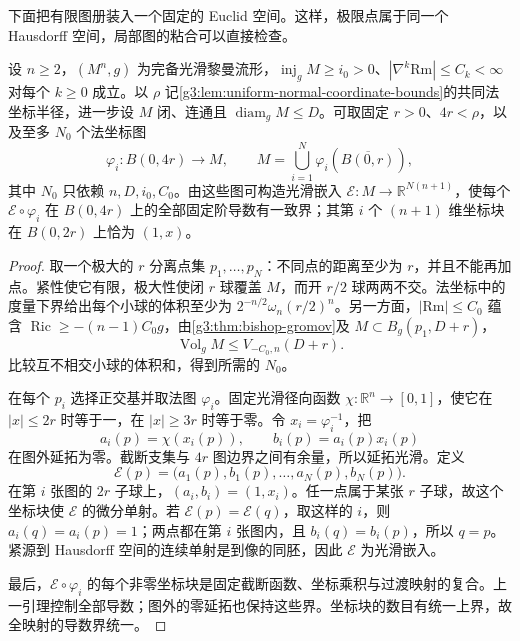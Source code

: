 下面把有限图册装入一个固定的 Euclid 空间。这样，极限点属于同一个 Hausdorff 空间，局部图的粘合可以直接检查。

\begin{lemma}\label{g3:lem:uniform-finite-atlas-embedding}
	设 \(n\ge2\)，\((M^n,g)\) 为完备光滑黎曼流形，\(\operatorname{inj}_gM\ge i_0>0\)、\(|\nabla^k\mathrm{Rm}|\le C_k<\infty\) 对每个 \(k\ge0\) 成立。以 \(\rho\) 记\cref{g3:lem:uniform-normal-coordinate-bounds}的共同法坐标半径，进一步设 \(M\) 闭、连通且 \(\operatorname{diam}_gM\le D\)。可取固定 \(r>0\)、\(4r<\rho\)，以及至多 \(N_0\) 个法坐标图
	\[
		\varphi_i:B(0,4r)\longrightarrow M,
		\qquad M=\bigcup_{i=1}^N\varphi_i(\overline{B(0,r)}),
	\]
	其中 \(N_0\) 只依赖 \(n,D,i_0,C_0\)。由这些图可构造光滑嵌入
	\(\mathcal E:M\to\mathbb R^{N(n+1)}\)，使每个
	\(\mathcal E\circ\varphi_i\) 在 \(B(0,4r)\) 上的全部固定阶导数有一致界；其第 \(i\) 个 \((n+1)\) 维坐标块在 \(B(0,2r)\) 上恰为 \((1,x)\)。
\end{lemma}
\begin{proof}
	取一个极大的 \(r\) 分离点集 \(p_1,\ldots,p_N\)：不同点的距离至少为 \(r\)，并且不能再加点。紧性使它有限，极大性使闭 \(r\) 球覆盖 \(M\)，而开 \(r/2\) 球两两不交。法坐标中的度量下界给出每个小球的体积至少为
	\(2^{-n/2}\omega_n(r/2)^n\)。另一方面，\(|\mathrm{Rm}|\le C_0\) 蕴含 \(\operatorname{Ric}\ge-(n-1)C_0g\)，由\cref{g3:thm:bishop-gromov}及 \(M\subset B_g(p_1,D+r)\)，
	\[
		\operatorname{Vol}_gM\le V_{-C_0,n}(D+r).
	\]
	比较互不相交小球的体积和，得到所需的 \(N_0\)。

	在每个 \(p_i\) 选择正交基并取法图 \(\varphi_i\)。固定光滑径向函数 \(\chi:\mathbb R^n\to[0,1]\)，使它在 \(|x|\le2r\) 时等于一，在 \(|x|\ge3r\) 时等于零。令 \(x_i=\varphi_i^{-1}\)，把
	\[
		a_i(p)=\chi(x_i(p)),\qquad b_i(p)=a_i(p)x_i(p)
	\]
	在图外延拓为零。截断支集与 \(4r\) 图边界之间有余量，所以延拓光滑。定义
	\begin{equation}\label{g3:eq:finite-atlas-embedding}
		\mathcal E(p)=\bigl(a_1(p),b_1(p),\ldots,a_N(p),b_N(p)\bigr).
	\end{equation}
	在第 \(i\) 张图的 \(2r\) 子球上，\((a_i,b_i)=(1,x_i)\)。任一点属于某张 \(r\) 子球，故这个坐标块使 \(\mathcal E\) 的微分单射。若 \(\mathcal E(p)=\mathcal E(q)\)，取这样的 \(i\)，则 \(a_i(q)=a_i(p)=1\)；两点都在第 \(i\) 张图内，且 \(b_i(q)=b_i(p)\)，所以 \(q=p\)。紧源到 Hausdorff 空间的连续单射是到像的同胚，因此 \(\mathcal E\) 为光滑嵌入。

	最后，\(\mathcal E\circ\varphi_i\) 的每个非零坐标块是固定截断函数、坐标乘积与过渡映射的复合。上一引理控制全部导数；图外的零延拓也保持这些界。坐标块的数目有统一上界，故全映射的导数界统一。
\end{proof}

